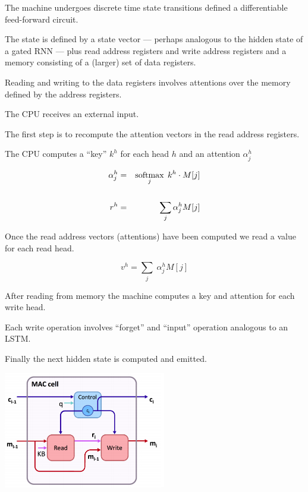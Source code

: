 {\vfill
The machine undergoes discrete time state transitions defined a differentiable feed-forward circuit.


The state is defined by a state vector --- perhaps analogous to the hidden state of a gated RNN --- plus read address registers
and write address registers and a memory consisting of a (larger) set of data registers.

\vfill
Reading and writing to the data registers involves attentions over the memory defined by the address registers.



\vfill
The CPU receives an external input.

\vfill
The first step is to recompute the attention vectors in the read address registers.

\vfill
The CPU computes a ``key'' $k^h$ for each head $h$ and an attention $\alpha_j^h$

\begin{eqnarray*}
  \alpha^h_j & = & \operatorname*{softmax}_j\;k^h \cdot M[j] \\
  \\
  r^h & = & \sum_j \alpha_j^h M[j]
\end{eqnarray*}


Once the read address vectors (attentions) have been computed we read a value for each read head.

\vfill
$$v^h = \sum_j \;\alpha^h_j M[j]$$

After reading from memory the machine computes a key and attention for each write head.

\vfill
Each write operation involves ``forget'' and ``input'' operation analogous to an LSTM.

\vfill
Finally the next hidden state is computed and emitted.


\centerline{\includegraphics[height = 2.0in]{../images/MACcell}}

}
